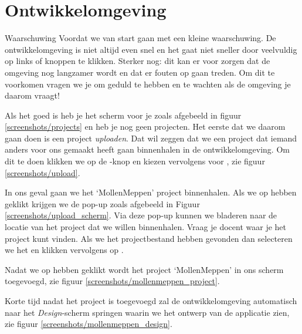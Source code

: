 \chapter{Ontwikkelomgeving}
\label{chap:ontwikkelomgeving}

\begin{derivation}{Waarschuwing}
Voordat we van start gaan met \ai een kleine waarschuwing. De ontwikkelomgeving is niet altijd even snel en het gaat niet sneller door veelvuldig op links of knoppen te klikken. Sterker nog: dit kan er voor zorgen dat de omgeving nog langzamer wordt en dat er fouten op gaan treden. Om dit te voorkomen vragen we je om geduld te hebben en te wachten als de omgeving je daarom vraagt!
\end{derivation}

Als het goed is heb je het scherm voor je zoals afgebeeld in figuur \ref{screenshots/projects} en heb je nog geen projecten. Het eerste dat we daarom gaan doen is een project \emph{uploaden}. Dat wil zeggen dat we een project dat iemand anders voor ons gemaakt heeft gaan binnenhalen in de  ontwikkelomgeving. Om dit te doen klikken we op de -knop en kiezen vervolgens voor , zie figuur \ref{screenshots/upload}.


In ons geval gaan we het `MollenMeppen' project binnenhalen. Als we op  hebben geklikt krijgen we de pop-up zoals afgebeeld in Figuur \ref{screenshots/upload_scherm}. Via deze pop-up kunnen we bladeren naar de locatie van het project dat we willen binnenhalen. Vraag je docent waar je het project kunt vinden.
Als we het projectbestand hebben gevonden dan selecteren we het en klikken vervolgens op .
 
Nadat  we op  hebben geklikt wordt het project `MollenMeppen' in ons scherm toegevoegd, zie figuur \ref{screenshots/mollenmeppen_project}.


Korte tijd nadat het project is toegevoegd zal de ontwikkelomgeving automatisch naar het \emph{Design}-scherm springen waarin we het ontwerp van de applicatie zien, zie figuur \ref{screenshots/mollenmeppen_design}. 

